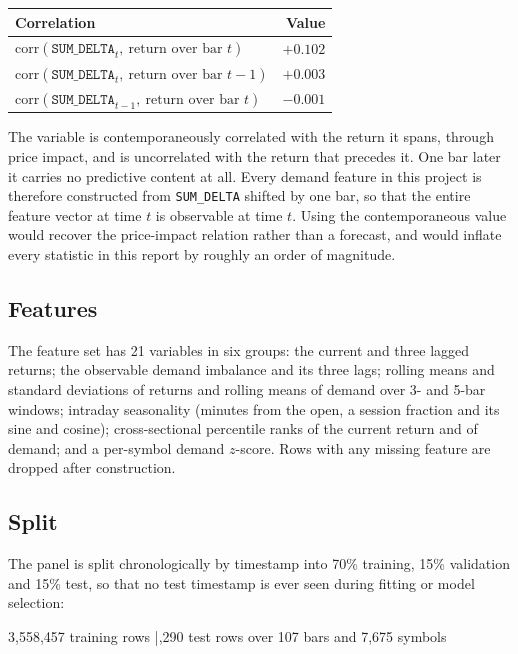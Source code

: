 \documentclass[11pt]{article}
\begin{document}
\begin{center}
\begin{tabular}{lr}
\toprule
Correlation & Value \\
\midrule
$\mathrm{corr}(\texttt{SUM\_DELTA}_t,\ \text{return over bar } t)$ & $+0.102$ \\
$\mathrm{corr}(\texttt{SUM\_DELTA}_t,\ \text{return over bar } t-1)$ & $+0.003$ \\
$\mathrm{corr}(\texttt{SUM\_DELTA}_{t-1},\ \text{return over bar } t)$ & $-0.001$ \\
\bottomrule
\end{tabular}
\end{center}

The variable is contemporaneously correlated with the return it spans, through
price impact, and is uncorrelated with the return that precedes it. One bar
later it carries no predictive content at all. Every demand feature in this
project is therefore constructed from \texttt{SUM\_DELTA} shifted by one bar, so
that the entire feature vector at time $t$ is observable at time $t$. Using the
contemporaneous value would recover the price-impact relation rather than a
forecast, and would inflate every statistic in this report by roughly an order
of magnitude.

\subsection{Features}

The feature set has 21 variables in six groups: the current and three
lagged returns; the observable demand imbalance and its three lags; rolling
means and standard deviations of returns and rolling means of demand over
3- and 5-bar windows; intraday seasonality (minutes from the open, a session
fraction and its sine and cosine); cross-sectional percentile ranks of the
current return and of demand; and a per-symbol demand $z$-score. Rows with any
missing feature are dropped after construction.

\subsection{Split}

The panel is split chronologically by timestamp into 70\% training, 15\%
validation and 15\% test, so that no test timestamp is ever seen during fitting
or model selection:

\begin{center}
3,558,457 training rows \quad|,290 test rows over
107 bars and 7,675 symbols
\end{center}
\end{document}
